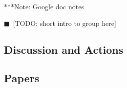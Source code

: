 \documentclass[11pt, oneside]{amsart}
\newcommand{\todo}[1]{{\color{blue}$\blacksquare$~\textsf{[TODO: #1]}}}
\newcommand{\note}[1]{ {\textcolor{blueish}    { ***Note:      #1 }}}
\begin{document}
\note{\href{http://tinyurl.com/pn4eq8z}{Google doc notes}}

\todo{short intro to group here}

\subsection{Discussion and Actions}

\subsection{Papers}
\end{document}
